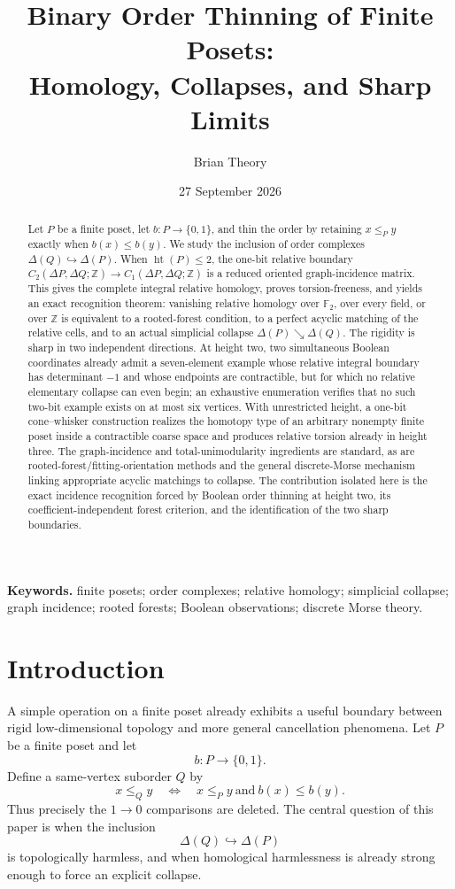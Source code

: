 \documentclass[11pt]{article}
\title{\textbf{Binary Order Thinning of Finite Posets:\\Homology, Collapses, and Sharp Limits}}
\author{Brian Theory}
\date{27 September 2026}
\theoremstyle{definition}
\theoremstyle{remark}
\DeclareMathOperator{\posht}{ht}
\newcommand{\Z}{\mathbb Z}
\newcommand{\Ftwo}{\mathbb F_2}
\newcommand{\D}{\Delta}
\newcommand{\searrowrel}{\mathrel{\searrow}}
\begin{document}
\maketitle

\begin{abstract}
Let $P$ be a finite poset, let $b:P\to\{0,1\}$, and thin the order by retaining
$x\le_Py$ exactly when $b(x)\le b(y)$.  We study the inclusion of order complexes
$\D(Q)\hookrightarrow\D(P)$.  When $\posht(P)\le2$, the one-bit relative boundary
$C_2(\D P,\D Q;\Z)\to C_1(\D P,\D Q;\Z)$ is a reduced oriented graph-incidence
matrix.  This gives the complete integral relative homology, proves torsion-freeness,
and yields an exact recognition theorem: vanishing relative homology over $\Ftwo$,
over every field, or over $\Z$ is equivalent to a rooted-forest condition, to a
perfect acyclic matching of the relative cells, and to an actual simplicial collapse
$\D(P)\searrowrel\D(Q)$.  The rigidity is sharp in two independent directions.
At height two, two simultaneous Boolean coordinates already admit a seven-element
example whose relative integral boundary has determinant $-1$ and whose endpoints
are contractible, but for which no relative elementary collapse can even begin;
an exhaustive enumeration verifies that no such two-bit example exists on at most
six vertices.  With unrestricted height, a one-bit cone--whisker construction
realizes the homotopy type of an arbitrary nonempty finite poset inside a contractible
coarse space and produces relative torsion already in height three.  The graph-incidence and total-unimodularity ingredients are standard, as are
rooted-forest/fitting-orientation methods and the general discrete-Morse mechanism
linking appropriate acyclic matchings to collapse.  The contribution isolated here is
the exact incidence recognition forced by Boolean order thinning at height two, its
coefficient-independent forest criterion, and the identification of the two sharp
boundaries.
\end{abstract}

\noindent\textbf{Keywords.} finite posets; order complexes; relative homology; simplicial collapse;
graph incidence; rooted forests; Boolean observations; discrete Morse theory.

\section{Introduction}\label{sec:intro}

A simple operation on a finite poset already exhibits a useful boundary between rigid
low-dimensional topology and more general cancellation phenomena.  Let $P$ be a finite
poset and let
\[
  b:P\longrightarrow\{0,1\}.
\]
Define a same-vertex suborder $Q$ by
\begin{equation}\label{eq:binary-thinning}
  x\le_Q y\quad\Longleftrightarrow\quad x\le_P y\ \text{and}\ b(x)\le b(y).
\end{equation}
Thus precisely the $1\to0$ comparisons are deleted.  The central question of this
paper is when the inclusion
\[
  \D(Q)\hookrightarrow\D(P)
\]
is topologically harmless, and when homological harmlessness is already strong enough
to force an explicit collapse.
\end{document}
